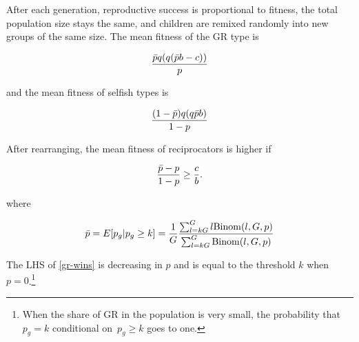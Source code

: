 \documentclass[12pt,a4paper]{article}
\begin{document}
After each generation, reproductive success is proportional to fitness, the total population size stays the same, and children are remixed randomly into new groups of the same size.
%
The mean fitness of the GR type is

\begin{equation*}
\frac{
  \bar{p} q(q(\bar{p} b - c))
}{
  p
}
\end{equation*}

and the mean fitness of selfish types is

\begin{equation*}
\frac{
  (1 - \bar{p})q(q\bar{p} b)
}{
  1 - p
}
\end{equation*}

After rearranging, the mean fitness of reciprocators is higher if


\begin{equation}
\label{gr-wins}
\frac{ \bar{p} - p}{ 1 - p} \ge \frac{c}{b}.
\end{equation}

where 

\[
\bar{p} = E[p_g | p_g \ge k] = \frac{1}{G} \frac{\sum_{l=kG}^G l \mathrm{Binom}(l,G,p)}{\sum_{l=kG}^G \mathrm{Binom}(l,G,p)}
\]

The LHS of \eqref{gr-wins} is decreasing in $p$ and is equal
to the threshold $k$ when $p = 0$.\footnote{
    When the share of GR in the population is very small, the probability that $p_g = k$ conditional on~$p_g\geq k$ goes to one.
}
\end{document}
